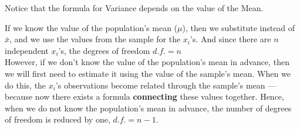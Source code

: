 Notice that the formula for Variance depends on the value of the Mean.

If we know the value of the population's mean (\(\mu\)), then we substitute instead of \(\bar{x}\), and we use the values from the sample for the \(x_i\)'s. And since there are \(n\) independent \(x_i\)'s, the degrees of freedom \(d.f.=n\)
\\
However, if we don't know the value of the population's mean in advance, then we will first need to estimate it using the value of the sample's mean. When we do this, the \(x_i\)'s observations become related through the sample's mean — because now there exists a formula \textbf{connecting} these values together. Hence, when we do not know the population's mean in advance, the number of degrees of freedom is reduced by one, \ie \(d.f.=n-1\).

\newpage